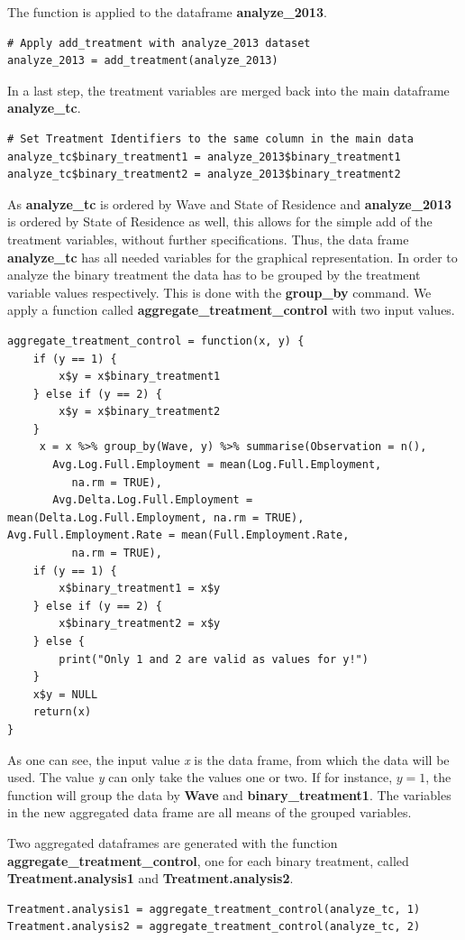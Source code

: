 \documentclass[a4paper]{article}
\begin{document}
{The function is applied to the dataframe \textbf{analyze\_2013}. 
\begin{lstlisting}
# Apply add_treatment with analyze_2013 dataset
analyze_2013 = add_treatment(analyze_2013)
\end{lstlisting}
In a last step, the treatment variables are merged back into the main dataframe \textbf{analyze\_tc}.
\begin{lstlisting}
# Set Treatment Identifiers to the same column in the main data
analyze_tc$binary_treatment1 = analyze_2013$binary_treatment1
analyze_tc$binary_treatment2 = analyze_2013$binary_treatment2
\end{lstlisting}
As \textbf{analyze\_tc} is ordered by Wave and State of Residence and \textbf{analyze\_2013} is ordered by State of Residence as well, this allows for the simple add of the treatment variables, without further specifications. \newline
Thus, the data frame \textbf{analyze\_tc} has all needed variables for the graphical representation. In order to analyze the binary treatment the data has to be grouped by the treatment variable values respectively. This is done with the \textbf{group\_by} command. We apply a function called \textbf{aggregate\_treatment\_control} with two input values.
\begin{lstlisting}
aggregate_treatment_control = function(x, y) {
    if (y == 1) {
        x$y = x$binary_treatment1
    } else if (y == 2) {
        x$y = x$binary_treatment2
    }
     x = x %>% group_by(Wave, y) %>% summarise(Observation = n(),
       Avg.Log.Full.Employment = mean(Log.Full.Employment,
          na.rm = TRUE),  
       Avg.Delta.Log.Full.Employment = 									mean(Delta.Log.Full.Employment, na.rm = TRUE), 				          Avg.Full.Employment.Rate = mean(Full.Employment.Rate, 
          na.rm = TRUE),
    if (y == 1) {
        x$binary_treatment1 = x$y
    } else if (y == 2) {
        x$binary_treatment2 = x$y
    } else {
        print("Only 1 and 2 are valid as values for y!")
    }
    x$y = NULL
    return(x)
}
\end{lstlisting}
As one can see, the input value \textit{x} is the data frame, from which the data will be used. The value \textit{y} can only take the values one or two. If for instance, $ y = 1 $, the function will group the data by \textbf{Wave} and \textbf{binary\_treatment1}. The variables in the new aggregated data frame are all means of the grouped variables.

Two aggregated dataframes are generated with the function \textbf{aggregate\_treatment\_control}, one for each binary treatment, called \textbf{Treatment.analysis1} and \textbf{Treatment.analysis2}.
\begin{lstlisting}
Treatment.analysis1 = aggregate_treatment_control(analyze_tc, 1)
Treatment.analysis2 = aggregate_treatment_control(analyze_tc, 2)
\end{lstlisting}

}
\end{document}
